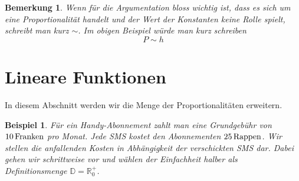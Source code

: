 \documentclass[%
11pt,%
twoside,%
titlepage,%
swissgerman,%
headsepline%
]{scrartcl}
\theoremstyle{definition}
\newtheorem{bsp}{Beispiel}[subsection] %
\newtheorem{bem}{Bemerkung}[subsection] %
\theoremstyle{plain}
\newtheorem{bsp}{Beispiel}[subsection] %
\newtheorem{bem}{Bemerkung}[subsection] %
\theoremstyle{plain}
\begin{document}
	\begin{bem}
		Wenn für die Argumentation bloss wichtig ist, dass es sich um eine Proportionalität handelt und der Wert der Konstanten keine Rolle spielt, schreibt man kurz \glqq$\sim$\grqq. Im obigen Beispiel würde man kurz schreiben
		$$P\sim h$$
	\end{bem}
	
	\section{Lineare Funktionen}
	
	In diesem Abschnitt werden wir die Menge der Proportionalitäten erweitern.
	
	\begin{bsp}
		Für ein Handy-Abonnement zahlt man eine Grundgebühr von $\unit[10]{Franken}$ pro Monat. Jede SMS kostet den Abonnementen $\unit[25]{Rappen}$. Wir stellen die anfallenden Kosten in Abhängigkeit der verschickten SMS dar. Dabei gehen wir schrittweise vor und wählen der Einfachheit halber als Defini\-tions\-menge $\mathbb{D}=\mathbb{R}^+_0$.
		

\end{bsp}
\end{document}
